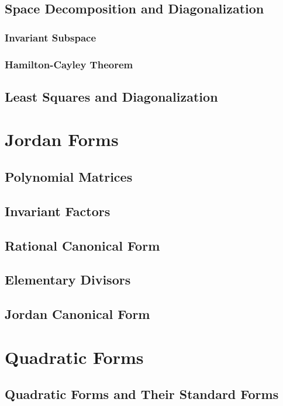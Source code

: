 \documentclass[11pt]{../../TexTemplate/elegantbook} %
\begin{document}
\section{Space Decomposition and Diagonalization}

\subsection{Invariant Subspace}

\subsection{Hamilton-Cayley Theorem}

\section{Least Squares and Diagonalization}

\chapter{Jordan Forms}
\section{Polynomial Matrices}

\section{Invariant Factors}

\section{Rational Canonical Form}

\section{Elementary Divisors}

\section{Jordan Canonical Form}

\chapter{Quadratic Forms}
\section{Quadratic Forms and Their Standard Forms}
\end{document}
